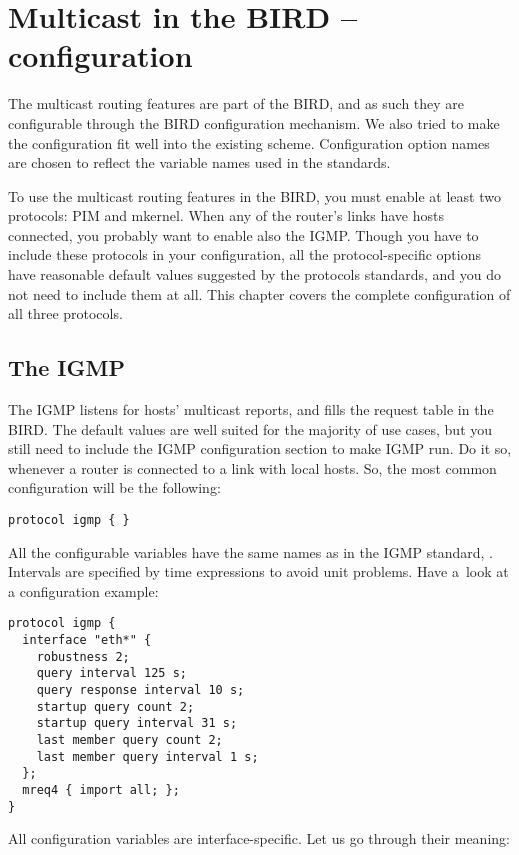 \chapter{Multicast in the BIRD -- configuration}

The multicast routing features are part of the BIRD, and as such they are
configurable through the BIRD configuration mechanism. We also tried to make
the configuration fit well into the existing scheme. Configuration option
names are chosen to reflect the variable names used in the standards.

To use the multicast routing features in the BIRD, you must enable at least two
protocols: PIM and mkernel. When any of the router's links have hosts
connected, you probably want to enable also the IGMP. Though you have to
include these protocols in your configuration, all the protocol-specific
options have reasonable default values suggested by the protocols standards, and
you do not need to include them at all. This chapter covers the complete
configuration of all three protocols.

\section{The IGMP}

The IGMP listens for hosts' multicast reports, and fills the request table in
the BIRD. The default values are well suited for the majority of use cases, but
you still need to include the IGMP configuration section to make IGMP run. Do it
so, whenever a router is connected to a link with local hosts. So, the most
common configuration will be the following:

\begin{lstlisting}
protocol igmp { }
\end{lstlisting}

\noindent All the configurable variables have the same names as in the IGMP standard, .
Intervals are specified by time expressions to avoid unit problems. Have a~look
at a configuration example:

\begin{lstlisting}
protocol igmp {
  interface "eth*" {
    robustness 2;
    query interval 125 s;
    query response interval 10 s;
    startup query count 2;
    startup query interval 31 s;
    last member query count 2;
    last member query interval 1 s;
  };
  mreq4 { import all; };
}
\end{lstlisting}

\noindent All configuration variables are interface-specific. Let us go through their meaning:

